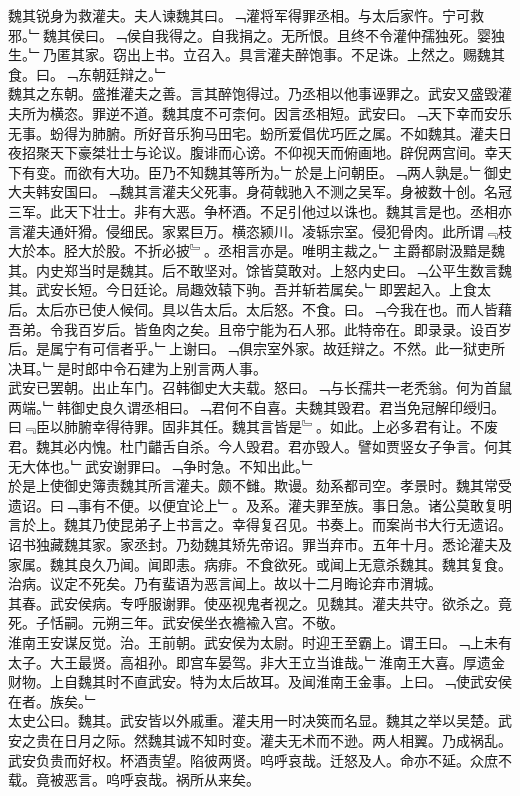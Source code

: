 \documentclass{zhvt-classic}
\begin{document}
\hspace*{2em}魏其锐身为救灌夫。夫人谏魏其曰。﹁灌将军得罪丞相。与太后家忤。宁可救邪。﹂魏其侯曰。﹁侯自我得之。自我捐之。无所恨。且终不令灌仲孺独死。婴独生。﹂乃匿其家。窃出上书。立召入。具言灌夫醉饱事。不足诛。上然之。赐魏其食。曰。﹁东朝廷辩之。﹂\\
\hspace*{2em}魏其之东朝。盛推灌夫之善。言其醉饱得过。乃丞相以他事诬罪之。武安又盛毁灌夫所为横恣。罪逆不道。魏其度不可柰何。因言丞相短。武安曰。﹁天下幸而安乐无事。蚡得为肺腑。所好音乐狗马田宅。蚡所爱倡优巧匠之属。不如魏其。灌夫日夜招聚天下豪桀壮士与论议。腹诽而心谤。不仰视天而俯画地。辟倪两宫间。幸天下有变。而欲有大功。臣乃不知魏其等所为。﹂於是上问朝臣。﹁两人孰是。﹂御史大夫韩安国曰。﹁魏其言灌夫父死事。身荷戟驰入不测之吴军。身被数十创。名冠三军。此天下壮士。非有大恶。争杯酒。不足引他过以诛也。魏其言是也。丞相亦言灌夫通奸猾。侵细民。家累巨万。横恣颍川。凌轹宗室。侵犯骨肉。此所谓﹃枝大於本。胫大於股。不折必披﹄。丞相言亦是。唯明主裁之。﹂主爵都尉汲黯是魏其。内史郑当时是魏其。后不敢坚对。馀皆莫敢对。上怒内史曰。﹁公平生数言魏其。武安长短。今日廷论。局趣效辕下驹。吾并斩若属矣。﹂即罢起入。上食太后。太后亦已使人候伺。具以告太后。太后怒。不食。曰。﹁今我在也。而人皆藉吾弟。令我百岁后。皆鱼肉之矣。且帝宁能为石人邪。此特帝在。即录录。设百岁后。是属宁有可信者乎。﹂上谢曰。﹁俱宗室外家。故廷辩之。不然。此一狱吏所决耳。﹂是时郎中令石建为上别言两人事。\\
\hspace*{2em}武安已罢朝。出止车门。召韩御史大夫载。怒曰。﹁与长孺共一老秃翁。何为首鼠两端。﹂韩御史良久谓丞相曰。﹁君何不自喜。夫魏其毁君。君当免冠解印绶归。曰﹃臣以肺腑幸得待罪。固非其任。魏其言皆是﹄。如此。上必多君有让。不废君。魏其必内愧。杜门齰舌自杀。今人毁君。君亦毁人。譬如贾竖女子争言。何其无大体也。﹂武安谢罪曰。﹁争时急。不知出此。﹂\\
\hspace*{2em}於是上使御史簿责魏其所言灌夫。颇不雠。欺谩。劾系都司空。孝景时。魏其常受遗诏。曰﹁事有不便。以便宜论上﹂。及系。灌夫罪至族。事日急。诸公莫敢复明言於上。魏其乃使昆弟子上书言之。幸得复召见。书奏上。而案尚书大行无遗诏。诏书独藏魏其家。家丞封。乃劾魏其矫先帝诏。罪当弃市。五年十月。悉论灌夫及家属。魏其良久乃闻。闻即恚。病痱。不食欲死。或闻上无意杀魏其。魏其复食。治病。议定不死矣。乃有蜚语为恶言闻上。故以十二月晦论弃市渭城。\\
\hspace*{2em}其春。武安侯病。专呼服谢罪。使巫视鬼者视之。见魏其。灌夫共守。欲杀之。竟死。子恬嗣。元朔三年。武安侯坐衣襜褕入宫。不敬。\\
\hspace*{2em}淮南王安谋反觉。治。王前朝。武安侯为太尉。时迎王至霸上。谓王曰。﹁上未有太子。大王最贤。高祖孙。即宫车晏驾。非大王立当谁哉。﹂淮南王大喜。厚遗金财物。上自魏其时不直武安。特为太后故耳。及闻淮南王金事。上曰。﹁使武安侯在者。族矣。﹂\\
\hspace*{2em}太史公曰。魏其。武安皆以外戚重。灌夫用一时决筴而名显。魏其之举以吴楚。武安之贵在日月之际。然魏其诚不知时变。灌夫无术而不逊。两人相翼。乃成祸乱。武安负贵而好权。杯酒责望。陷彼两贤。呜呼哀哉。迁怒及人。命亦不延。众庶不载。竟被恶言。呜呼哀哉。祸所从来矣。\\
\end{document}

